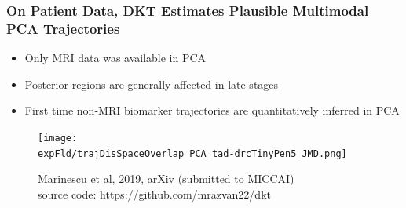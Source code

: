 \documentclass[8pt,xcolor=table]{beamer}
\begin{document}
\begin{frame}
\frametitle{On Patient Data, DKT Estimates Plausible Multimodal PCA Trajectories}


\begin{itemize}
\item Only MRI data was available in PCA
\item Posterior regions are generally affected in late stages 
\item First time non-MRI biomarker trajectories are quantitatively inferred in PCA
\end{itemize}


\begin{figure}
\centering
 \texttt{[image: \\expFld/trajDisSpaceOverlap\_PCA\_tad-drcTinyPen5\_JMD.png]}
 
 Marinescu et al, 2019, arXiv (submitted to MICCAI)\\
 source code: https://github.com/mrazvan22/dkt
 \label{fig:PCAtrajByModality}
\end{figure}



\end{frame}
\end{document}
